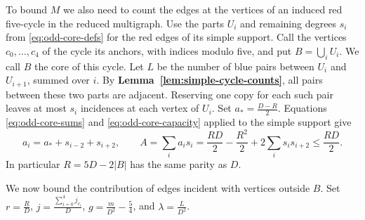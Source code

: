 To bound $M$ we also need to count the edges at the vertices of an
induced red five-cycle in the reduced multigraph. Use the parts $U_i$
and remaining degrees $s_i$ from \eqref{eq:odd-core-defs} for the red
edges of its simple support. Call the vertices $c_0,\ldots,c_4$ of
the cycle its anchors, with indices modulo five, and put
$B=\bigcup_i U_i$. We call $B$ the core of this cycle.
Let $L$ be the number of blue pairs between $U_i$ and $U_{i+1}$,
summed over $i$. By \textbf{Lemma~\ref{lem:simple-cycle-counts}},
all pairs between these two parts are adjacent. Reserving one copy
for each such pair leaves at most $s_i$ incidences at each vertex of
$U_i$. Set $a_*=\frac{D-R}{2}$. Equations \eqref{eq:odd-core-sums}
and \eqref{eq:odd-core-capacity} applied to the simple support give
\begin{equation}\label{eq:multi-core-identities}
 a_i=a_*+s_{i-2}+s_{i+2},\qquad
 A=\sum_i a_is_i=\frac{RD}{2}-\frac{R^2}{2}
             +2\sum_i s_i s_{i+2}\le\frac{RD}{2}.
\end{equation}
In particular $R=5D-2|B|$ has the same parity as $D$.

We now bound the contribution of edges incident with vertices outside $B$.
Set $r=\frac{R}{D}$, $j=\frac{\sum_{i=0}^4j_{c_i}}{D}$,
$g=\frac{m}{D^2}-\frac{5}{4}$, and $\lambda=\frac{L}{D^2}$.

